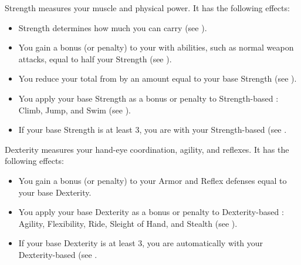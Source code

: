         \label{Strength}
        {
            Strength measures your muscle and physical power.
            It has the following effects:
            \begin{itemize}
                \item Strength determines how much you can carry (see ).
                \item You gain a bonus (or penalty) to your  with  abilities, such as normal weapon attacks, equal to half your Strength (see ).
                \item You reduce your total  from  by an amount equal to your base Strength (see ).
                \item You apply your base Strength as a bonus or penalty to Strength-based : Climb, Jump, and Swim (see ).
                \item If your base Strength is at least 3, you are  with your Strength-based  (see .
            \end{itemize}
        }

        \label{Dexterity}
        {
            Dexterity measures your hand-eye coordination, agility, and reflexes.
            It has the following effects:
            \begin{itemize}
                \item You gain a bonus (or penalty) to your Armor and Reflex defenses equal to your base Dexterity.
                \item You apply your base Dexterity as a bonus or penalty to Dexterity-based : Agility, Flexibility, Ride, Sleight of Hand, and Stealth (see ).
                \item If your base Dexterity is at least 3, you are automatically  with your Dexterity-based  (see .
            \end{itemize}
        }

